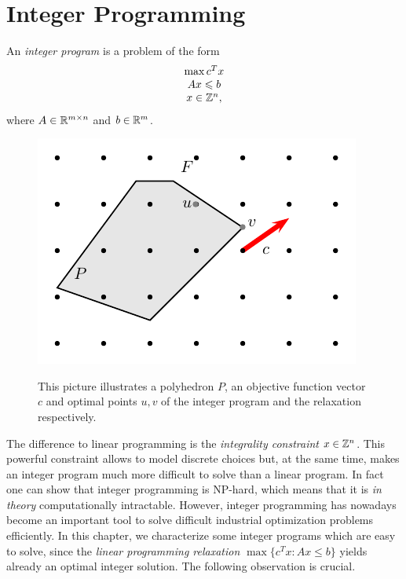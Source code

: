 \chapter{Integer Programming}
\label{sec:integer-programming}

An \emph{integer program} is a problem of the form 
\begin{displaymath}
  \begin{array}{c}
    \max c^Tx \\
    Ax\leqslant b \\
    x \in \mathbb{Z}^n,
  \end{array}
\end{displaymath}
where $A \in \mathbb{R}^{m\times n}$ and $b \in \mathbb{R}^m$. 


 

\begin{figure}[htbp]
  \begin{center}
   \includegraphics{./figures/IntProg1.pdf}
\label{fig:inthull}
  \end{center}
  \caption{This picture illustrates a polyhedron $P$, an objective
    function vector $c$ and optimal points $u,v$ of the integer
    program and the relaxation respectively. }
\end{figure}



The difference to linear programming is the \emph{integrality
  constraint} $x \in \mathbb{Z}^n$. This powerful constraint allows to
model discrete choices but, at the same time, makes an integer program
much more difficult to solve than a linear program. In fact one can
show that integer programming is NP-hard, which means that it is
\emph{in theory} computationally intractable. However, integer
programming has nowadays become an important tool to solve difficult
industrial optimization problems efficiently. In this chapter, we
characterize some integer programs which are easy to solve, since the
\emph{linear programming relaxation} $\max\{c^Tx \colon Ax\leq b\}$
yields already an optimal integer solution. The following observation
is crucial.

